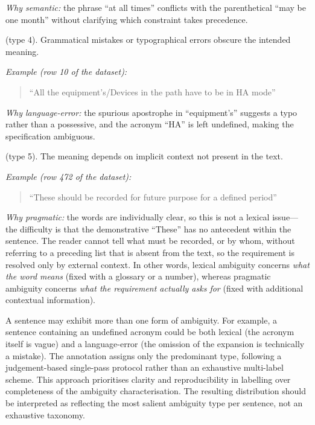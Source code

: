 \begin{description}
    \textit{Why semantic:} the phrase ``at all times'' conflicts with the parenthetical ``may be one month'' without clarifying which constraint takes precedence.

    \item[Language-error ambiguity] (type 4). Grammatical mistakes or typographical errors obscure the intended meaning.

    \textit{Example (row 10 of the dataset):}
    \begin{quote}
        ``All the equipment's/Devices in the path have to be in HA mode''
    \end{quote}

    \textit{Why language-error:} the spurious apostrophe in ``equipment's'' suggests a typo rather than a possessive, and the acronym ``HA'' is left undefined, making the specification ambiguous.

    \item[Pragmatic ambiguity] (type 5). The meaning depends on implicit context not present in the text.

    \textit{Example (row 472 of the dataset):}
    \begin{quote}
        ``These should be recorded for future purpose for a defined period''
    \end{quote}

    \textit{Why pragmatic:} the words are individually clear, so this is not a lexical issue---the difficulty is that the demonstrative ``These'' has no antecedent within the sentence. The reader cannot tell what must be recorded, or by whom, without referring to a preceding list that is absent from the text, so the requirement is resolved only by external context. In other words, lexical ambiguity concerns \textit{what the word means} (fixed with a glossary or a number), whereas pragmatic ambiguity concerns \textit{what the requirement actually asks for} (fixed with additional contextual information).
\end{description}

A sentence may exhibit more than one form of ambiguity. For example, a sentence containing an undefined acronym could be both lexical (the acronym itself is vague) and a language-error (the omission of the expansion is technically a mistake). The annotation assigns only the predominant type, following a judgement-based single-pass protocol rather than an exhaustive multi-label scheme. This approach prioritises clarity and reproducibility in labelling over completeness of the ambiguity characterisation. The resulting distribution should be interpreted as reflecting the most salient ambiguity type per sentence, not an exhaustive taxonomy.

